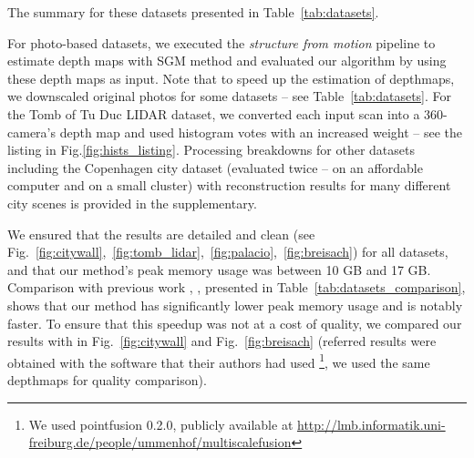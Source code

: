 \documentclass[10pt,twocolumn,letterpaper]{article}
\begin{document}
The summary for these datasets presented in Table~\ref{tab:datasets}.

For photo-based datasets, we executed the \textit{structure from motion} pipeline to estimate depth maps with SGM \cite{hirschmuller2007stereo}
method and evaluated our algorithm by using these depth maps as input. Note that to speed up the estimation of depthmaps, we downscaled original photos for some datasets -- see Table~\ref{tab:datasets}.
For the Tomb of Tu Duc LIDAR dataset, we converted each input scan into a 360-camera's depth map and used histogram votes with an increased weight -- see the listing in Fig.\ref{fig:hists_listing}.
Processing breakdowns for other datasets including the Copenhagen city dataset (evaluated twice -- on an affordable computer and on a small cluster) with reconstruction results for many different city scenes is provided in the supplementary.

We ensured that the results are detailed and clean (see Fig.~\ref{fig:citywall},~\ref{fig:tomb_lidar},~\ref{fig:palacio},~\ref{fig:breisach}) for all datasets, and that our method's peak memory usage was between 10 GB and 17 GB.
Comparison with previous work \cite{ummenhofer2015global}, \cite{mostegel2017scalable}, presented in Table~\ref{tab:datasets_comparison}, shows that our method has significantly lower peak memory usage and is notably faster.
To ensure that this speedup was not at a cost of quality, we compared our results with  \cite{ummenhofer2015global} in Fig.~\ref{fig:citywall} and Fig.~\ref{fig:breisach}
(referred results were obtained with the software that their authors had used \footnote{We used pointfusion 0.2.0, publicly available at \url{http://lmb.informatik.uni-freiburg.de/people/ummenhof/multiscalefusion}}, we used the same depthmaps for quality comparison).
\end{document}
